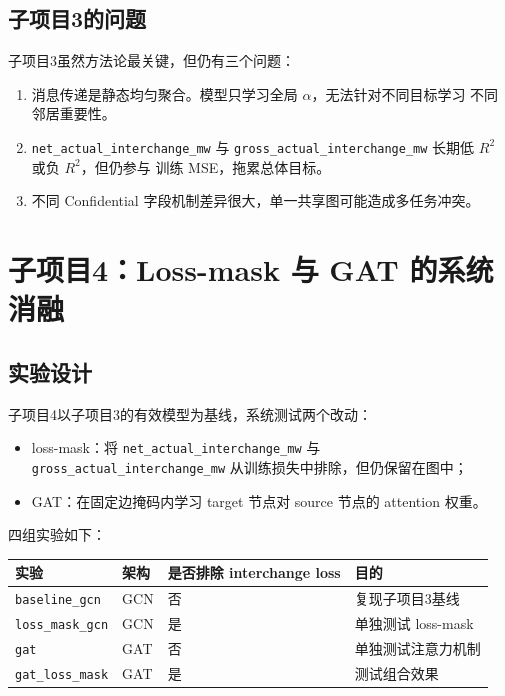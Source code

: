 \documentclass[UTF8,a4paper,11pt]{ctexart}
\begin{document}
\subsection{子项目3的问题}

子项目3虽然方法论最关键，但仍有三个问题：
\begin{enumerate}
  \item 消息传递是静态均匀聚合。模型只学习全局 $\alpha$，无法针对不同目标学习
  不同邻居重要性。
  \item \texttt{net\_actual\_interchange\_mw} 与
  \texttt{gross\_actual\_interchange\_mw} 长期低 $R^2$ 或负 $R^2$，但仍参与
  训练 MSE，拖累总体目标。
  \item 不同 Confidential 字段机制差异很大，单一共享图可能造成多任务冲突。
\end{enumerate}

\section{子项目4：Loss-mask 与 GAT 的系统消融}

\subsection{实验设计}

子项目4以子项目3的有效模型为基线，系统测试两个改动：
\begin{itemize}
  \item loss-mask：将 \texttt{net\_actual\_interchange\_mw} 与
  \texttt{gross\_actual\_interchange\_mw} 从训练损失中排除，但仍保留在图中；
  \item GAT：在固定边掩码内学习 target 节点对 source 节点的 attention 权重。
\end{itemize}

四组实验如下：
\begin{center}
\begin{tabular}{llll}
\toprule
实验 & 架构 & 是否排除 interchange loss & 目的 \\
\midrule
\texttt{baseline\_gcn} & GCN & 否 & 复现子项目3基线 \\
\texttt{loss\_mask\_gcn} & GCN & 是 & 单独测试 loss-mask \\
\texttt{gat} & GAT & 否 & 单独测试注意力机制 \\
\texttt{gat\_loss\_mask} & GAT & 是 & 测试组合效果 \\
\bottomrule
\end{tabular}
\end{center}
\end{document}
